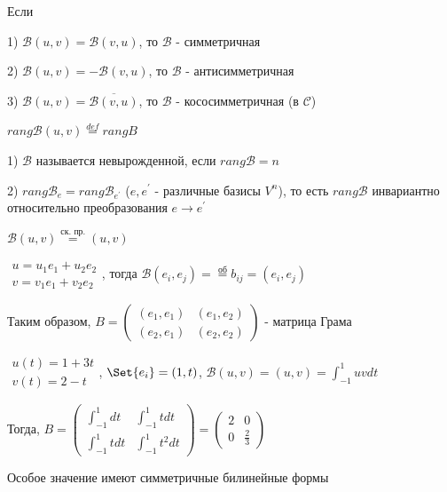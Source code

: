 \documentclass[12pt]{article}
\begin{document}
    \Def Если

    1) $\mathcal{B}(u, v) = \mathcal{B}(v, u)$, то $\mathcal{B}$ - симметричная

    2) $\mathcal{B}(u, v) = -\mathcal{B}(v, u)$, то $\mathcal{B}$ - антисимметричная

    3) $\mathcal{B}(u, v) = \overline{\mathcal{B}(v, u)}$, то $\mathcal{B}$ - кососимметричная (в $\mathcal{C}$)

    \Def $rang \mathcal{B}(u, v) \stackrel{def}{=} rang B$

    \Nota

    1) $\mathcal{B}$ называется невырожденной, если $rang \mathcal{B} = n$

    2) $\displaystyle rang \mathcal{B}_e = rang \mathcal{B}_{e^\prime} $ ($\displaystyle e, e^\prime$ - различные базисы $\displaystyle V^n$), то есть $rang \mathcal{B}$ инвариантно относительно преобразования $\displaystyle e \to e^\prime$

    \Ex $\mathcal{B}(u, v) \stackrel{\text{ск. пр.}}{=} (u, v)$

    $\displaystyle \begin{matrix}u = u_1 e_1 + u_2 e_2 \\ v = v_1 e_1 + v_2 e_2\end{matrix}$, тогда $\displaystyle \mathcal{B}(e_i, e_j) = \stackrel{\text{об}}{=} b_{ij} = (e_i, e_j)$

    Таким образом, $\displaystyle B = \begin{pmatrix}(e_1, e_1) & (e_1, e_2) \\ (e_2, e_1) & (e_2, e_2)\end{pmatrix}$ - матрица Грама

    \Ex $\begin{matrix}u(t) = 1 + 3t \\ v(t) = 2 - t\end{matrix}$, $\displaystyle \Set{e_i} = (1, t)$, $\displaystyle \mathcal{B}(u, v) = (u, v) = \int_{-1}^1 uv dt$

    Тогда, $\displaystyle B = \begin{pmatrix}\int_{-1}^1 dt & \int_{-1}^1 t dt \\ \int_{-1}^1 t dt & \int_{-1}^1 t^2 dt\end{pmatrix} = \begin{pmatrix}2 & 0 \\ 0 & \frac{2}{3}\end{pmatrix}$



    \Nota Особое значение имеют симметричные билинейные формы
\end{document}
